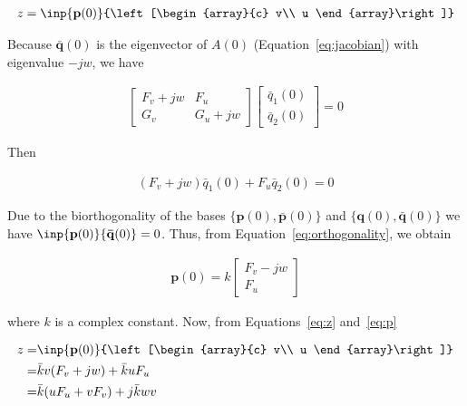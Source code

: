 \documentclass{article}
\theoremstyle{lemma}
\begin{document}
\begin{align}
z=\inp{\mathbf{p}(0)}{\left[\begin{array}{c}
                             v\\
                             u
                            \end{array}\right]}
\label{eq:z}
\end{align}

Because $\mathbf{\bar{q}}(0)$ is the
eigenvector of $A(0)$ (Equation~\ref{eq:jacobian}) with eigenvalue $-jw$, we have

\begin{align}
\left[\begin{array}{cc}
       F_v+jw&F_u\\
       G_v&G_u+jw
      \end{array}\right]
\left[\begin{array}{c}
       \bar{q}_1(0)\\
       \bar{q}_2(0)
      \end{array}\right]=0\nonumber
\end{align}

\noindent Then 

\begin{align}
(F_v+jw)\bar{q}_1(0)+F_u\bar{q}_2(0)=0
\label{eq:orthogonality}
\end{align}

\noindent Due to the
biorthogonality of the bases $\{\mathbf{p}(0),\mathbf{\bar{p}}(0)\}$ and
$\{\mathbf{q}(0),\mathbf{\bar{q}}(0)\}$ we have
$\inp{\mathbf{p}(0)}{\mathbf{\bar{q}}(0)}=0$. Thus, from
Equation~\ref{eq:orthogonality}, we obtain

\begin{align}
    \mathbf{p}(0)=k\left[\begin{array}{c}
                          F_v-jw\\
                          F_u
                         \end{array}\right]\label{eq:p}
\end{align}

\noindent where $k$ is a complex constant. Now, from Equations~\ref{eq:z}
and~\ref{eq:p}

\begin{align}
z=&\inp{\mathbf{p}(0)}{\left[\begin{array}{c}
                              v\\
                              u
                             \end{array}\right]}\nonumber\\
=&\bar{k}v(F_v+jw)+\bar{k}uF_u\nonumber\\
=&\bar{k}(uF_u+vF_v)+j\bar{k}wv\label{eq:zAsFvu}
\end{align}
\end{document}
